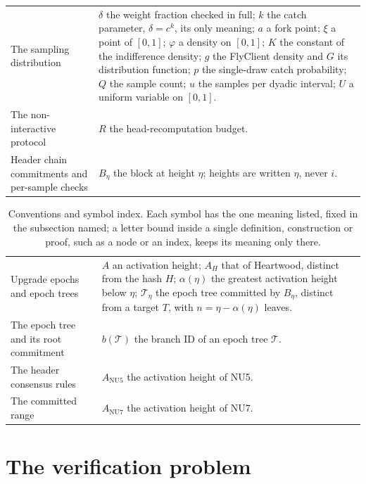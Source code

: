 \documentclass[11pt,a4paper]{article}
\theoremstyle{definition}
\begin{document}
\begin{table}[p]
\begin{tabular}{@{}p{3.6cm}p{\dimexpr\linewidth-3.6cm-2\tabcolsep\relax}@{}}
\raggedright The sampling distribution &
$\delta$ the weight fraction checked in full; $k$ the catch parameter,
$\delta = c^k$, its only meaning; $a$ a fork point; $\xi$ a point of
$[0, 1]$; $\varphi$ a density on $[0, 1]$; $K$ the constant of the
indifference density; $g$ the FlyClient density and $G$ its distribution
function; $p$ the single-draw catch probability; $Q$ the sample count; $u$
the samples per dyadic interval; $U$ a uniform variable on $[0, 1]$. \\
\raggedright The non-interactive protocol &
$R$ the head-recomputation budget. \\
\raggedright Header chain commitments and per-sample checks &
$B_\eta$ the block at height $\eta$; heights are written $\eta$, never
$i$. \\
\bottomrule
\end{tabular}
\end{table}
\begin{table}[tp]
\centering
\footnotesize
\renewcommand{\arraystretch}{1.08}
\begin{tabular}{@{}p{3.6cm}p{\dimexpr\linewidth-3.6cm-2\tabcolsep\relax}@{}}
\toprule
\raggedright Upgrade epochs and epoch trees &
$A$ an activation height; $A_H$ that of Heartwood, distinct from the hash
$H$; $\alpha(\eta)$ the greatest activation height below $\eta$;
$\mathcal{T}_\eta$ the epoch tree committed by $B_\eta$, distinct from a
target $T$, with $n = \eta - \alpha(\eta)$ leaves. \\
\raggedright The epoch tree and its root commitment &
$b(\mathcal{T})$ the branch ID of an epoch tree $\mathcal{T}$. \\
\raggedright The header consensus rules &
$A_{\mathrm{NU5}}$ the activation height of NU5. \\
\raggedright The committed range &
$A_{\mathrm{NU7}}$ the activation height of NU7. \\
\bottomrule
\end{tabular}
\caption{Conventions and symbol index. Each symbol has the one meaning
listed, fixed in the subsection named; a letter bound inside a single
definition, construction or proof, such as a node or an index, keeps its
meaning only there.}
\label{tab:notation}
\end{table}

\section{The verification problem}\label{sec:problem}
\end{document}
